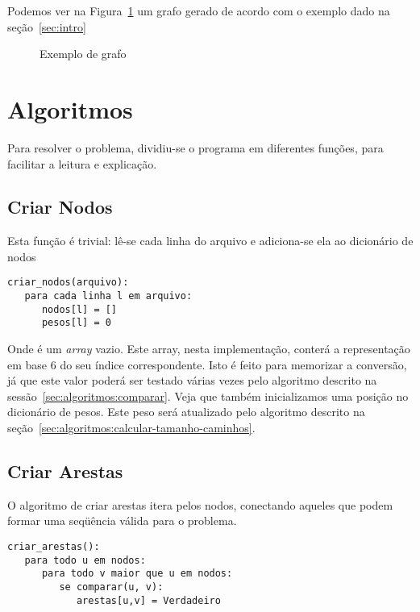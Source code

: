 \documentclass[12pt]{article}
\begin{document}

Podemos ver na Figura~\ref{fig:testeprof} um grafo gerado de acordo com o exemplo dado na se\c{c}ão~\ref{sec:intro}

\begin{figure}[h!]
    \begin{dot2tex}[neato,options=-tmath]
        
    \end{dot2tex}
    \caption{Exemplo de grafo}
    \label{fig:testeprof}
\end{figure}


\section{Algoritmos}\label{sec:algoritmos}
Para resolver o problema, dividiu-se o programa em diferentes fun\c{c}ões, para facilitar a leitura e explica\c{c}ão.

\subsection{Criar Nodos}\label{sec:algoritmos:criar-nodos}
Esta fun\c{c}ão é trivial: lê-se cada linha do arquivo e adiciona-se ela ao dicionário de nodos
\begin{lstlisting}
criar_nodos(arquivo):
   para cada linha l em arquivo:
      nodos[l] = []
      pesos[l] = 0
\end{lstlisting}

Onde {\sf []} é um \textit{array} vazio. Este array, nesta implementa\c{c}ão, conterá a representa\c{c}ão em base 6 do seu índice correspondente. Isto é feito para memorizar a conversão, já que este valor poderá ser testado várias vezes pelo algoritmo descrito na sessão~\ref{sec:algoritmos:comparar}.
Veja que também inicializamos uma posi\c{c}ão no dicionário de pesos. Este peso será atualizado pelo algoritmo descrito na se\c{c}ão~\ref{sec:algoritmos:calcular-tamanho-caminhos}.

\subsection{Criar Arestas}\label{sec:algoritmos:criar-arestas}
O algoritmo de criar arestas itera pelos nodos, conectando aqueles que podem formar uma seqüência válida para o problema.
\begin{lstlisting}
criar_arestas():
   para todo u em nodos:
      para todo v maior que u em nodos:
         se comparar(u, v):
            arestas[u,v] = Verdadeiro
\end{lstlisting}
\end{document}
